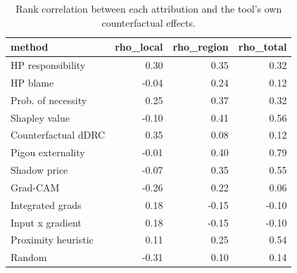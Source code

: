 \begin{table}
\caption{Rank correlation between each attribution and the tool's own counterfactual effects.}
\label{tab:rank_correlation}
\begin{tabular}{lrrr}
\toprule
method & rho_local & rho_region & rho_total \\
\midrule
HP responsibility & 0.30 & 0.35 & 0.32 \\
HP blame & -0.04 & 0.24 & 0.12 \\
Prob. of necessity & 0.25 & 0.37 & 0.32 \\
Shapley value & -0.10 & 0.41 & 0.56 \\
Counterfactual dDRC & 0.35 & 0.08 & 0.12 \\
Pigou externality & -0.01 & 0.40 & 0.79 \\
Shadow price & -0.07 & 0.35 & 0.55 \\
Grad-CAM & -0.26 & 0.22 & 0.06 \\
Integrated grads & 0.18 & -0.15 & -0.10 \\
Input x gradient & 0.18 & -0.15 & -0.10 \\
Proximity heuristic & 0.11 & 0.25 & 0.54 \\
Random & -0.31 & 0.10 & 0.14 \\
\bottomrule
\end{tabular}
\end{table}

